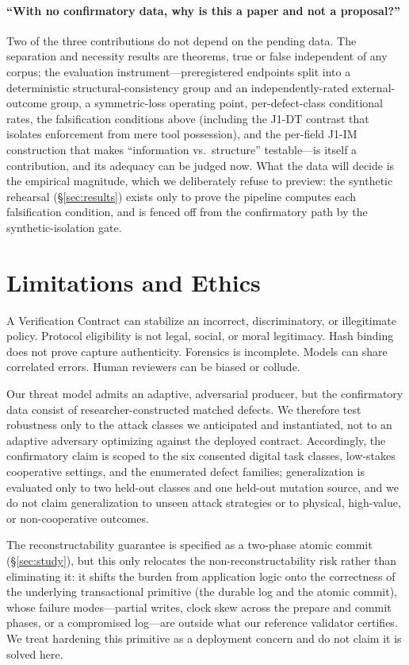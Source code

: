 \documentclass[sigconf,anonymous,review]{acmart}
\begin{document}
\paragraph{``With no confirmatory data, why is this a paper and not a proposal?''} Two of the three contributions do not depend on the pending data. The separation and necessity results are theorems, true or false independent of any corpus; the evaluation instrument---preregistered endpoints split into a deterministic structural-consistency group and an independently-rated external-outcome group, a symmetric-loss operating point, per-defect-class conditional rates, the falsification conditions above (including the J1-DT contrast that isolates enforcement from mere tool possession), and the per-field J1-IM construction that makes ``information vs.\ structure'' testable---is itself a contribution, and its adequacy can be judged now. What the data will decide is the empirical magnitude, which we deliberately refuse to preview: the synthetic rehearsal (\S\ref{sec:results}) exists only to prove the pipeline computes each falsification condition, and is fenced off from the confirmatory path by the synthetic-isolation gate.

\section{Limitations and Ethics}
\label{sec:limitations}
A Verification Contract can stabilize an incorrect, discriminatory, or illegitimate policy. Protocol eligibility is not legal, social, or moral legitimacy. Hash binding does not prove capture authenticity. Forensics is incomplete. Models can share correlated errors. Human reviewers can be biased or collude.

Our threat model admits an adaptive, adversarial producer, but the confirmatory data consist of researcher-constructed matched defects. We therefore test robustness only to the attack classes we anticipated and instantiated, not to an adaptive adversary optimizing against the deployed contract. Accordingly, the confirmatory claim is scoped to the six consented digital task classes, low-stakes cooperative settings, and the enumerated defect families; generalization is evaluated only to two held-out classes and one held-out mutation source, and we do not claim generalization to unseen attack strategies or to physical, high-value, or non-cooperative outcomes.

The reconstructability guarantee is specified as a two-phase atomic commit (\S\ref{sec:study}), but this only relocates the non-reconstructability risk rather than eliminating it: it shifts the burden from application logic onto the correctness of the underlying transactional primitive (the durable log and the atomic commit), whose failure modes---partial writes, clock skew across the prepare and commit phases, or a compromised log---are outside what our reference validator certifies. We treat hardening this primitive as a deployment concern and do not claim it is solved here.
\end{document}
